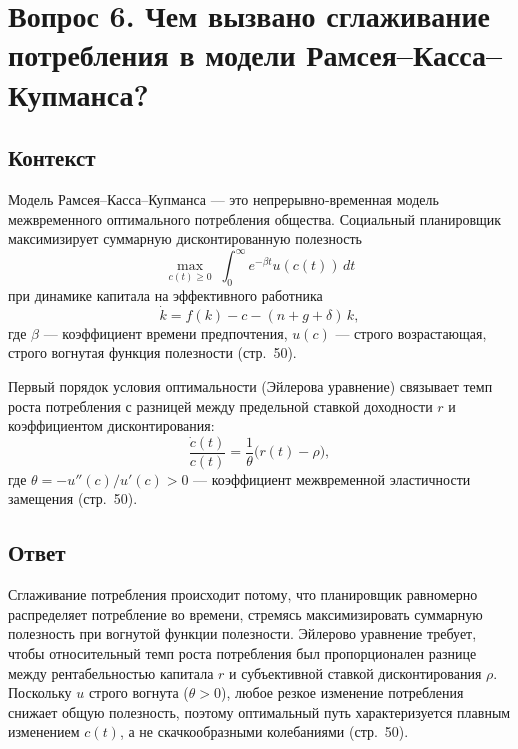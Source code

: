 \section*{Вопрос 6. Чем вызвано сглаживание потребления в модели Рамсея–Касса–Купманса?}

\subsection*{Контекст}
Модель Рамсея–Касса–Купманса — это непрерывно‑временная модель межвременного оптимального потребления общества. Социальный 
планировщик максимизирует суммарную дисконтированную полезность
\[
\max_{c(t)\ge0}\;\int_{0}^{\infty} e^{-\beta t} u(c(t))\,dt
\]
при динамике капитала на эффективного работника
\[
\dot k = f(k) - c - (n+g+\delta)\,k,
\]
где \(\beta\) — коэффициент времени предпочтения, \(u(c)\) — строго возрастающая, строго вогнутая
 функция полезности (стр.~50).

Первый порядок условия оптимальности (Эйлерова уравнение) связывает темп роста потребления с разницей между предельной ставкой 
доходности \(r\) и коэффициентом дисконтирования:
\[
\frac{\dot c(t)}{c(t)} = \frac{1}{\theta}\bigl(r(t) - \rho\bigr),
\]
где \(\theta = -u''(c)/u'(c)>0\) — коэффициент межвременной эластичности замещения (стр.~50).

\subsection*{Ответ}
Сглаживание потребления происходит потому, что планировщик равномерно распределяет потребление во времени, стремясь максимизировать 
суммарную полезность при вогнутой функции полезности. Эйлерово уравнение требует, чтобы относительный темп роста потребления был 
пропорционален разнице между рентабельностью капитала \(r\) и субъективной ставкой дисконтирования \(\rho\). Поскольку \(u\) 
строго вогнута (\(\theta>0\)), любое резкое изменение потребления снижает общую полезность, поэтому оптимальный путь 
характеризуется плавным изменением \(c(t)\), а не скачкообразными колебаниями (стр.~50).

